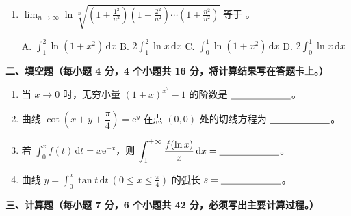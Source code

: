\documentclass[a4paper,11pt]{ctexart}
\newcommand{\dd}{\,\mathrm{d}}
\newcommand{\e}{\mathrm{e}}
\newcommand{\blank}[1][2.2cm]{\underline{\hspace{#1}}}
\newcommand{\choice}[1]{\text{【\quad】}}
\begin{document}
\begin{enumerate}[label=\arabic*., leftmargin=2em, itemsep=0.65em, topsep=0.5em]
  B. $f'(0)$ 不存在

  D. $f(x)$ 在 $x=0$ 处取得极大值

  \item $\displaystyle\lim_{n\to\infty}\ln\sqrt[n]{\left(1+\frac{1^2}{n^2}\right)\left(1+\frac{2^2}{n^2}\right)\cdots\left(1+\frac{n^2}{n^2}\right)}$ 等于 \choice{}。

  A. $\displaystyle\int_1^2 \ln(1+x^2)\dd x$ \qquad
  B. $2\displaystyle\int_1^2 \ln x\dd x$ \qquad
  C. $\displaystyle\int_0^1 \ln(1+x^2)\dd x$ \qquad
  D. $2\displaystyle\int_0^1 \ln x\dd x$
\end{enumerate}

\newpage

\textbf{二、填空题（每小题 4 分，4 个小题共 16 分，将计算结果写在答题卡上。）}

\begin{enumerate}[label=\arabic*., start=7, leftmargin=2em, itemsep=0.75em, topsep=0.45em]
  \item 当 $x\to 0$ 时，无穷小量 $(1+x)^{x^2}-1$ 的阶数是 $\blank$。

  \item 曲线 $\cot\!\left(x+y+\dfrac{\pi}{4}\right)=\e^y$ 在点 $(0,0)$ 处的切线方程为 $\blank$。

  \item 若 $\displaystyle\int_0^x f(t)\dd t=x\e^{-x}$，则 $\displaystyle\int_1^{+\infty}\frac{f(\ln x)}{x}\dd x=\blank$。

  \item 曲线 $y=\displaystyle\int_0^x \tan t\dd t\ \left(0\le x\le\frac{\pi}{4}\right)$ 的弧长 $s=\blank$。
\end{enumerate}

\vspace{0.6em}

\textbf{三、计算题（每小题 7 分，6 个小题共 42 分，必须写出主要计算过程。）}
\end{document}
